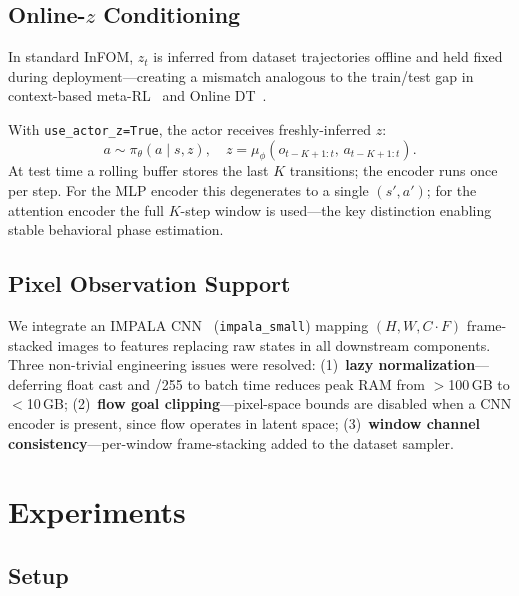 \documentclass{article}
\newcommand{\base}{InFOM}
\begin{document}
\subsection{Online-$z$ Conditioning}
\label{sec:onlinez}

In standard \base{}, $z_t$ is inferred from dataset trajectories offline
and held fixed during deployment---creating a mismatch analogous to
the train/test gap in context-based meta-RL~\citep{rakelly2019pearl}
and Online DT~\citep{zheng2022odt}.

With \texttt{use\_actor\_z=True}, the actor receives freshly-inferred $z$:
\begin{equation}
    a \sim \pi_\theta(a \mid s, z), \quad
    z = \mu_\phi(o_{t-K+1:t},\, a_{t-K+1:t}).
\end{equation}
At test time a rolling buffer stores the last $K$ transitions; the encoder
runs once per step.
For the MLP encoder this degenerates to a single $(s',a')$; for the
attention encoder the full $K$-step window is used---the key distinction
enabling stable behavioral phase estimation.

\subsection{Pixel Observation Support}
\label{sec:visual}

We integrate an IMPALA CNN~\citep{espeholt2018impala} (\texttt{impala\_small})
mapping $(H,W,C{\cdot}F)$ frame-stacked images to features replacing raw
states in all downstream components.
Three non-trivial engineering issues were resolved:
(1)~\textbf{lazy normalization}---deferring float cast and /255 to batch time
reduces peak RAM from $>$100\,GB to $<$10\,GB;
(2)~\textbf{flow goal clipping}---pixel-space bounds are disabled when a CNN
encoder is present, since flow operates in latent space;
(3)~\textbf{window channel consistency}---per-window frame-stacking added
to the dataset sampler.

\section{Experiments}
\label{sec:experiments}

\subsection{Setup}
\end{document}
